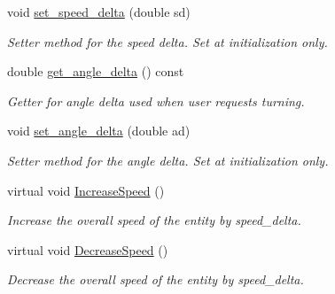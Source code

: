 \begin{DoxyCompactItemize}
void \mbox{\hyperlink{class_motion_handler_a908b330346b3fe969684106bd5c7619d}{set\+\_\+speed\+\_\+delta}} (double sd)
\begin{DoxyCompactList}\small\item\em Setter method for the speed delta. Set at initialization only. \end{DoxyCompactList}\item 
\mbox{\label{class_motion_handler_aa5ec33068c516234a6521de356b08d68}} 
double \mbox{\hyperlink{class_motion_handler_aa5ec33068c516234a6521de356b08d68}{get\+\_\+angle\+\_\+delta}} () const
\begin{DoxyCompactList}\small\item\em Getter for angle delta used when user requests turning. \end{DoxyCompactList}\item 
\mbox{\label{class_motion_handler_a8c2811ddf1a0f077fec829c460009286}} 
void \mbox{\hyperlink{class_motion_handler_a8c2811ddf1a0f077fec829c460009286}{set\+\_\+angle\+\_\+delta}} (double ad)
\begin{DoxyCompactList}\small\item\em Setter method for the angle delta. Set at initialization only. \end{DoxyCompactList}\item 
\mbox{\label{class_motion_handler_adfdbadc838050ee57945689183f34506}} 
virtual void \mbox{\hyperlink{class_motion_handler_adfdbadc838050ee57945689183f34506}{Increase\+Speed}} ()
\begin{DoxyCompactList}\small\item\em Increase the overall speed of the entity by speed\+\_\+delta. \end{DoxyCompactList}\item 
\mbox{\label{class_motion_handler_a527f08266130bceb6dc554cad9ad008b}} 
virtual void \mbox{\hyperlink{class_motion_handler_a527f08266130bceb6dc554cad9ad008b}{Decrease\+Speed}} ()
\begin{DoxyCompactList}\small\item\em Decrease the overall speed of the entity by speed\+\_\+delta. \end{DoxyCompactList}\item 
\mbox{\label{class_motion_handler_a4299b69223b25b8f368b7b1059abbf60}} 

\end{DoxyCompactItemize}
